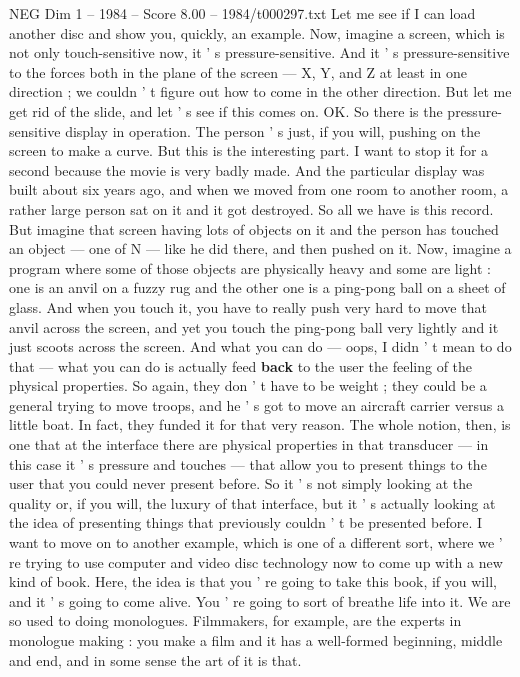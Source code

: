 \begin{textsample}{NEG Dim 1 – 1984 – Score 8.00 – 1984/t000297.txt}
Let me see if I can load another disc and show you, quickly, an example.
Now, imagine a screen, which is not only touch-sensitive now, it ' s pressure-sensitive.
And it ' s pressure-sensitive to the forces both in the plane of the screen — X, Y, and Z at least in one direction ; we couldn ' t figure out how to come in the other direction.
But let me get rid of the slide, and let ' s see if this comes on.
OK.
So there is the pressure-sensitive display in operation.
The person ' s just, if you will, pushing on the screen to make a curve.
But this is the interesting part.
I want to stop it for a second because the movie is very badly made.
And the particular display was built about six years ago, and when we moved from one room to another room, a rather large person sat on it and it got destroyed.
So all we have is this record.
But imagine that screen having lots of objects on it and the person has touched an object — one of N — like he did there, and then pushed on it.
Now, imagine a program where some of those objects are physically heavy and some are light : one is an anvil on a fuzzy rug and the other one is a ping-pong ball on a sheet of glass.
And when you touch it, you have to really push very hard to move that anvil across the screen, and yet you touch the ping-pong ball very lightly and it just scoots across the screen.
And what you can do — oops, I didn ' t mean to do that — what you can do is actually feed \textbf{back} to the user the feeling of the physical properties.
So again, they don ' t have to be weight ; they could be a general trying to move troops, and he ' s got to move an aircraft carrier versus a little boat.
In fact, they funded it for that very reason.
The whole notion, then, is one that at the interface there are physical properties in that transducer — in this case it ' s pressure and touches — that allow you to present things to the user that you could never present before.
So it ' s not simply looking at the quality or, if you will, the luxury of that interface, but it ' s actually looking at the idea of presenting things that previously couldn ' t be presented before.
I want to move on to another example, which is one of a different sort, where we ' re trying to use computer and video disc technology now to come up with a new kind of book.
Here, the idea is that you ' re going to take this book, if you will, and it ' s going to come alive.
You ' re going to sort of breathe life into it.
We are so used to doing monologues.
Filmmakers, for example, are the experts in monologue making : you make a film and it has a well-formed beginning, middle and end, and in some sense the art of it is that.

\end{textsample}
